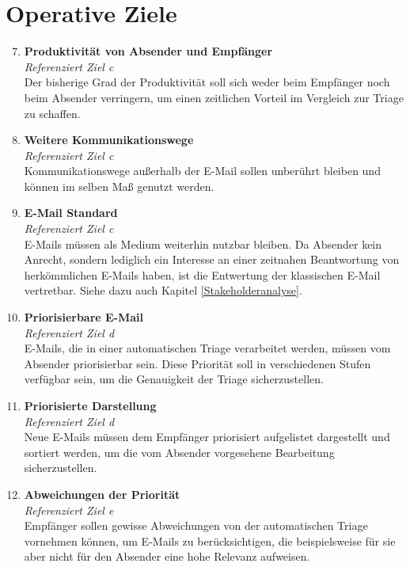 \section{Operative Ziele}
\label{Operative_Ziele}
\begin{enumerate}[label=(\alph*)]
\setcounter{enumi}{6}
    \item \textbf{Produktivität von Absender und Empfänger}\\
    \textit{Referenziert Ziel c} \\
        Der bisherige Grad der Produktivität soll sich weder beim Empfänger noch beim Absender verringern, um einen zeitlichen Vorteil im Vergleich zur Triage zu schaffen. 
        
    \item \textbf{Weitere Kommunikationswege}\\
    \textit{Referenziert Ziel c} \\
        Kommunikationswege außerhalb der E-Mail sollen unberührt bleiben und können im selben Maß genutzt werden. 
        
    \item \textbf{E-Mail Standard}\\
    \textit{Referenziert Ziel c} \\
        E-Mails müssen als Medium weiterhin nutzbar bleiben. Da Absender kein Anrecht, sondern lediglich ein Interesse an einer zeitnahen Beantwortung von herkömmlichen E-Mails haben, ist die Entwertung der klassischen E-Mail vertretbar. Siehe dazu auch Kapitel \ref{Stakeholderanalyse}.
    
    \item \textbf{Priorisierbare E-Mail}\\
    \textit{Referenziert Ziel d} \\
        E-Mails, die in einer automatischen Triage verarbeitet werden, müssen vom Absender priorisierbar sein. Diese Priorität soll in verschiedenen Stufen verfügbar sein, um die Genauigkeit der Triage sicherzustellen.
         
    \item \textbf{Priorisierte Darstellung}\\
    \textit{Referenziert Ziel d} \\
        Neue E-Mails müssen dem Empfänger priorisiert aufgelistet dargestellt und sortiert werden, um die vom Absender vorgesehene Bearbeitung sicherzustellen. 
        
    \item \textbf{Abweichungen der Priorität}\\
    \textit{Referenziert Ziel e} \\
        Empfänger sollen gewisse Abweichungen von der automatischen Triage vornehmen können, um E-Mails zu berücksichtigen, die beispielsweise für sie aber nicht für den Absender eine hohe Relevanz aufweisen.
        

\end{enumerate}
